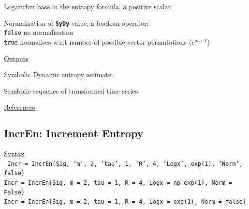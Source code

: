 \documentclass[12pt, a4paper, titlepage, openany]{book}
\begin{document}
\begin{description}[labelsep=1cm, labelwidth=2cm, nosep, style=multiline,leftmargin=3cm]
\begin{description}[labelsep=5em, labelwidth=8em, nosep,style=multiline,leftmargin=3cm]
	\end{description}
\item[\texttt{Logx}]	Logarithm base in the entropy formula, a positive scalar.
\item[\texttt{Norm}]    Normalisation of \texttt{\textbf{SyDy}} value, a boolean operator:\\
		  \texttt{false} \hspace{10pt} no normalisation \\
		  \texttt{true} \hspace{15pt}  normalises w.r.t number of possible vector permutations ($c^{m+1}$) \\
\end{description}

\noindent \ul{Outputs}
\begin{description}[labelsep=1cm, labelwidth=2cm, nosep, style=multiline,leftmargin=3cm]\footnotesize
\item[\texttt{SyDy}]		Symbolic Dynamic entropy estimate.
\item[\texttt{Zt}]		Symbolic sequence of transformed time series.
\end{description}

\noindent \ul{References}\hspace{1cm}
\cite{SyDy1} \cite{SyDy2} \cite{SyDy3}



\newpage
\subsection{\normalsize IncrEn: \hspace{15mm} Increment Entropy}
\noindent\ul{Syntax} \vspace{6mm} \\ \noindent \texttt{\footnotesize
Incr = IncrEn(Sig, ‘m’, 2, ‘tau’, 1, ‘R’, 4, ‘Logx’, exp(1), 'Norm', false) \\
Incr = IncrEn(Sig, m = 2, tau = 1, R = 4, Logx = np.exp(1), Norm = False) \\
Incr = IncrEn(Sig, m = 2, tau = 1, R = 4, Logx = exp(1), Norm = false)}
\end{document}
